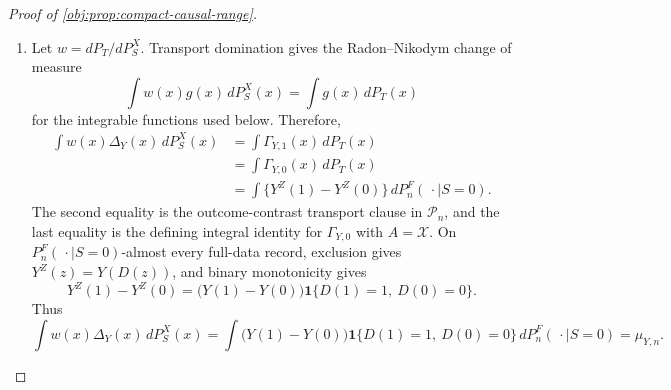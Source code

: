 \begin{proof}[Proof of \cref{obj:prop:compact-causal-range}]
\begin{enumerate}
For the outcome contrast, apply this identity with \(F_z=Y(D(z))\), the treatment-potential outcome evaluated at the receipt induced by assignment \(z\).  Under the observation map, an assigned source record with \(Z=z\) has observed coordinates \(D=D(z)\) and \(Y=Y(D(z))\), so the left side is the observed-source score integral from \cref{obj:lem:source-observation-facts}.  The right side is
\[
\int_{\{X\in A\}}\{Y(D(1))-Y(D(0))\}\,dP_n^F(\,\cdot\mid S=1),
\]
and exclusion rewrites \(Y(D(z))\) as \(Y^Z(z)\) \(P_n^F(\,\cdot\mid S=1)\)-almost surely.  Applying the same inverse-propensity identity to the receipt functions \(F_z=\mathbf 1[D(z)=1]\), and using the observed coordinate \(D=D(Z)\), gives
\[
\int_A\Delta_Y\,dP_S^X=\int_A\Gamma_{Y,1}\,dP_S^X,
\qquad
\int_A\Delta_D\,dP_S^X=\int_A\Gamma_{D,1}\,dP_S^X
\]
for every measurable \(A\).  The source-contrast integrability hypotheses and the boundedness supplied by \cref{obj:lem:source-observation-facts} give the integrability needed to recover equality from equality of all measurable-set integrals, hence
\[
\Delta_Y=\Gamma_{Y,1}\quad P_S^X\text{-a.e.},
\qquad
\Delta_D=\Gamma_{D,1}\quad P_S^X\text{-a.e.}
\]

\item Let \(w=dP_T/dP_S^X\).  Transport domination gives the Radon--Nikodym change of measure
\[
\int w(x)g(x)\,dP_S^X(x)=\int g(x)\,dP_T(x)
\]
for the integrable functions used below.  Therefore,
\[
\begin{aligned}
\int w(x)\Delta_Y(x)\,dP_S^X(x)
&=
\int \Gamma_{Y,1}(x)\,dP_T(x)\\
&=
\int \Gamma_{Y,0}(x)\,dP_T(x)\\
&=
\int \{Y^Z(1)-Y^Z(0)\}\,dP_n^F(\,\cdot\mid S=0).
\end{aligned}
\]
The second equality is the outcome-contrast transport clause in \(\mathcal P_n\), and the last equality is the defining integral identity for \(\Gamma_{Y,0}\) with \(A=\mathcal X\).  On \(P_n^F(\,\cdot\mid S=0)\)-almost every full-data record, exclusion gives \(Y^Z(z)=Y(D(z))\), and binary monotonicity gives
\[
Y^Z(1)-Y^Z(0)
=
\bigl(Y(1)-Y(0)\bigr)
\mathbf 1\{D(1)=1,\ D(0)=0\}.
\]
Thus
\[
\int w(x)\Delta_Y(x)\,dP_S^X(x)
=
\int \bigl(Y(1)-Y(0)\bigr)
\mathbf 1\{D(1)=1,\ D(0)=0\}\,dP_n^F(\,\cdot\mid S=0)
=
\mu_{Y,n}.
\]


\end{enumerate}
\end{proof}
